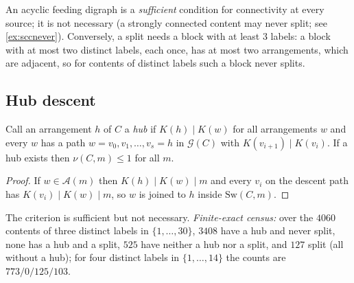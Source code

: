 \begin{remark}
An acyclic feeding digraph is a \emph{sufficient} condition for connectivity at every source; it is not necessary (a strongly connected content may never split; see \cref{ex:sccnever}). Conversely, a split needs a block with at least $3$ labels: a block with at most two distinct labels, each once, has at most two arrangements, which are adjacent, so for contents of distinct labels such a block never splits.
\end{remark}

\subsection{Hub descent}
\begin{proposition}\label{prop:hub}
Call an arrangement $h$ of $C$ a \emph{hub} if $K(h)\mid K(w)$ for all arrangements $w$ and every $w$ has a path $w=v_0,v_1,\dots,v_s=h$ in $\mathcal G(C)$ with $K(v_{i+1})\mid K(v_i)$. If a hub exists then $\nu(C,m)\le1$ for all $m$.
\end{proposition}
\begin{proof}
If $w\in\mathcal A(m)$ then $K(h)\mid K(w)\mid m$ and every $v_i$ on the descent path has $K(v_i)\mid K(w)\mid m$, so $w$ is joined to $h$ inside $\mathrm{Sw}(C,m)$.
\end{proof}
The criterion is sufficient but not necessary. \emph{Finite-exact census:} over the $4060$ contents of three distinct labels in $\{1,\dots,30\}$, $3408$ have a hub and never split, none has a hub and a split, $525$ have neither a hub nor a split, and $127$ split (all without a hub); for four distinct labels in $\{1,\dots,14\}$ the counts are $773/0/125/103$.

